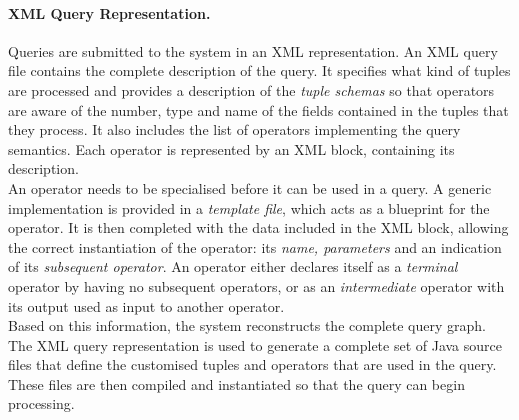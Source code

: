 \paragraph{XML Query Representation.} Queries are submitted to the system in an XML representation.
An XML query file contains the complete description of the query. It specifies what kind of tuples
are processed and provides a description of the \emph{tuple schemas} so that operators are aware of the
number, type and name of the fields contained in the tuples that they process. It also includes the list
of operators implementing the query semantics. Each operator is represented by an XML block, containing
its description. \\
An operator needs to be specialised before it can be used in a query. A
generic implementation is provided in a \emph{template file}, which acts as a blueprint for the operator.
It is then completed with the data included in the XML block, allowing the correct instantiation of the
operator: its \emph{name, parameters} and an indication of its \emph{subsequent operator}. An
operator either declares itself as a \emph{terminal} operator by having no subsequent operators, or as an
\emph{intermediate} operator with its output used as input to another operator.\\
Based on this information, the system reconstructs the complete query graph.
The XML query representation is used to generate a complete set of Java source files
that define the customised tuples and operators that are used in the query. These files are then compiled
and instantiated so that the query can begin processing. 


